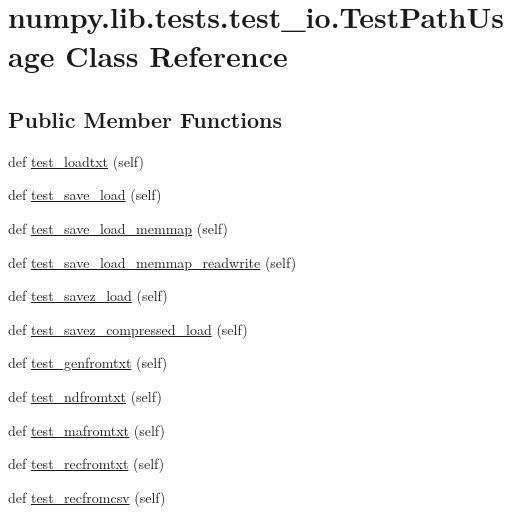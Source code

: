 \hypertarget{classnumpy_1_1lib_1_1tests_1_1test__io_1_1TestPathUsage}{}\section{numpy.\+lib.\+tests.\+test\+\_\+io.\+Test\+Path\+Usage Class Reference}
\label{classnumpy_1_1lib_1_1tests_1_1test__io_1_1TestPathUsage}
\subsection*{Public Member Functions}
\begin{DoxyCompactItemize}
\item 
def \hyperlink{classnumpy_1_1lib_1_1tests_1_1test__io_1_1TestPathUsage_a2cc44abc670b94020a77e0d41bad6ffd}{test\+\_\+loadtxt} (self)
\item 
def \hyperlink{classnumpy_1_1lib_1_1tests_1_1test__io_1_1TestPathUsage_ab2be93158d90d66f18950e536eb2ac8c}{test\+\_\+save\+\_\+load} (self)
\item 
def \hyperlink{classnumpy_1_1lib_1_1tests_1_1test__io_1_1TestPathUsage_a72d4c7a6f1b8f7868e8ead08dfe68015}{test\+\_\+save\+\_\+load\+\_\+memmap} (self)
\item 
def \hyperlink{classnumpy_1_1lib_1_1tests_1_1test__io_1_1TestPathUsage_a406bfbf5b72a76c33c476b112e75100c}{test\+\_\+save\+\_\+load\+\_\+memmap\+\_\+readwrite} (self)
\item 
def \hyperlink{classnumpy_1_1lib_1_1tests_1_1test__io_1_1TestPathUsage_a31494f4107010e2760d77b1283cdfded}{test\+\_\+savez\+\_\+load} (self)
\item 
def \hyperlink{classnumpy_1_1lib_1_1tests_1_1test__io_1_1TestPathUsage_a6de7e5d195ab9258db150587e6ace7fc}{test\+\_\+savez\+\_\+compressed\+\_\+load} (self)
\item 
def \hyperlink{classnumpy_1_1lib_1_1tests_1_1test__io_1_1TestPathUsage_afeedaaf216a46c4e87f5d5d51450c976}{test\+\_\+genfromtxt} (self)
\item 
def \hyperlink{classnumpy_1_1lib_1_1tests_1_1test__io_1_1TestPathUsage_af3be562def7c5fca165b2c4f6dfad6dd}{test\+\_\+ndfromtxt} (self)
\item 
def \hyperlink{classnumpy_1_1lib_1_1tests_1_1test__io_1_1TestPathUsage_a3a55ad3c7b701501990086a5bb4e3c86}{test\+\_\+mafromtxt} (self)
\item 
def \hyperlink{classnumpy_1_1lib_1_1tests_1_1test__io_1_1TestPathUsage_a9fe78dedfab5ea2decc6c585ec51b838}{test\+\_\+recfromtxt} (self)
\item 
def \hyperlink{classnumpy_1_1lib_1_1tests_1_1test__io_1_1TestPathUsage_a81b45b282f9acc9dfb8853d8c9464809}{test\+\_\+recfromcsv} (self)
\end{DoxyCompactItemize}


